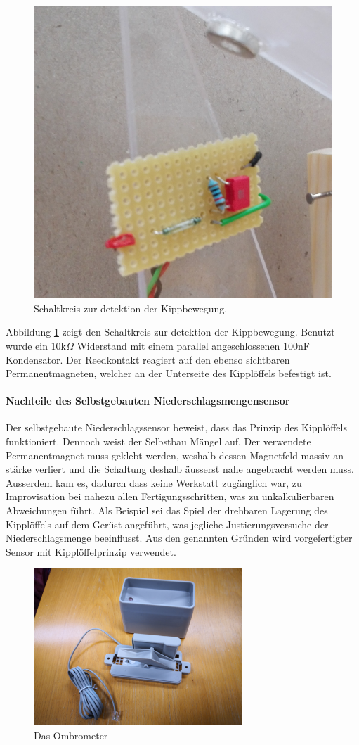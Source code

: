 \begin{figure}[h]
\centering
\includegraphics[width=0.4\linewidth]{graphics/KippSchalt.jpg}
\caption{Schaltkreis zur detektion der Kippbewegung.}
\label{fig:KippSchalt}
\end{figure}

Abbildung \ref{fig:KippSchalt} zeigt den Schaltkreis zur detektion der Kippbewegung. Benutzt wurde ein 10k$\Omega$ Widerstand mit einem parallel angeschlossenen 100nF Kondensator. Der Reedkontakt reagiert auf den ebenso sichtbaren Permanentmagneten, welcher an der Unterseite des Kipplöffels befestigt ist.

\newpage
\paragraph{Nachteile des Selbstgebauten Niederschlagsmengensensor}
Der selbstgebaute Niederschlagssensor beweist, dass das Prinzip des Kipplöffels funktioniert. Dennoch weist der Selbstbau Mängel auf. Der verwendete Permanentmagnet muss geklebt werden, weshalb dessen Magnetfeld massiv an stärke verliert und die Schaltung deshalb äusserst nahe angebracht werden muss. Ausserdem kam es, dadurch dass keine Werkstatt zugänglich war, zu Improvisation bei nahezu allen Fertigungsschritten, was zu unkalkulierbaren Abweichungen führt. Als Beispiel sei das Spiel der drehbaren Lagerung des Kipplöffels auf dem Gerüst angeführt, was jegliche Justierungsversuche der Niederschlagsmenge beeinflusst. Aus den genannten Gründen wird vorgefertigter Sensor mit Kipplöffelprinzip verwendet.\\

\begin{figure}[hbtp]
\centering
\includegraphics[width=0.7\textwidth]{graphics/ombrometer/IMG_20190118_110027.jpg}
\caption{Das Ombrometer}
\label{fig:verwendetes_ombrometer}
\end{figure}

